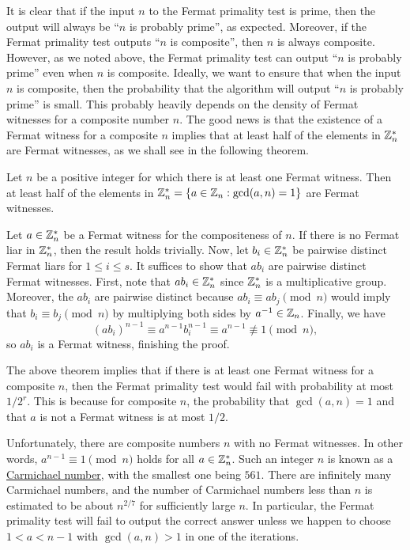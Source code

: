 It is clear that if the input $n$ to the Fermat primality test is prime, then the output 
will always be ``$n$ is probably prime'', as expected. Moreover, if the Fermat primality test 
outputs ``$n$ is composite'', then $n$ is always composite. However, as we noted above, the Fermat 
primality test can output ``$n$ is probably prime'' even when $n$ is composite. Ideally, we want 
to ensure that when the input $n$ is composite, then the probability that the algorithm will 
output ``$n$ is probably prime'' is small. This probably heavily depends on the density of Fermat 
witnesses for a composite number $n$. The good news is that the existence of a Fermat witness for a 
composite $n$ implies that at least half of the elements in $\mathbb{Z}_n^*$ are Fermat witnesses, as we 
shall see in the following theorem.

\begin{thm}
Let $n$ be a positive integer for which there is at least one Fermat witness. Then at least 
half of the elements in $\mathbb{Z}_n^* = \{a \in \mathbb{Z}_n : \gcd(a, n) = 1\}$ are Fermat witnesses. 
\end{thm}
\begin{pf}
Let $a \in \mathbb{Z}_n^*$ be a Fermat witness for the compositeness of $n$. If there is no Fermat liar in 
$\mathbb{Z}_n^*$, then the result holds trivially. Now, let $b_i \in \mathbb{Z}_n^*$ be pairwise distinct 
Fermat liars for $1 \leq i \leq s$. It suffices to show that $ab_i$ are pairwise distinct 
Fermat witnesses. First, note that $ab_i \in \mathbb{Z}_n^*$ since $\mathbb{Z}_n^*$ is a multiplicative group. 
Moreover, the $ab_i$ are pairwise distinct because $ab_i \equiv ab_j \pmod n$ would imply that 
$b_i \equiv b_j \pmod n$ by multiplying both sides by $a^{-1} \in \mathbb{Z}_n$. Finally, we have 
\[ (ab_i)^{n-1} \equiv a^{n-1} b_i^{n-1} \equiv a^{n-1} \not\equiv 1 \pmod n, \]
so $ab_i$ is a Fermat witness, finishing the proof. 
\end{pf}

The above theorem implies that if there is at least one Fermat witness for a composite $n$, then 
the Fermat primality test would fail with probability at most $1/2^r$. This is because for 
composite $n$, the probability that $\gcd(a, n) = 1$ and that $a$ is not a Fermat witness is at 
most $1/2$. 

Unfortunately, there are composite numbers $n$ with no Fermat witnesses. 
In other words, $a^{n-1} \equiv 1 \pmod n$ holds for all $a \in \mathbb{Z}_n^*$. Such an integer $n$ 
is known as a \href{https://en.wikipedia.org/wiki/Carmichael_number}{Carmichael number}, with the smallest one being $561$. There are 
infinitely many Carmichael numbers, and the number of Carmichael numbers less than $n$ is 
estimated to be about $n^{2/7}$ for sufficiently large $n$. In particular, the Fermat primality 
test will fail to output the correct answer unless we happen to choose $1 < a < n-1$ with 
$\gcd(a, n) > 1$ in one of the iterations. 

